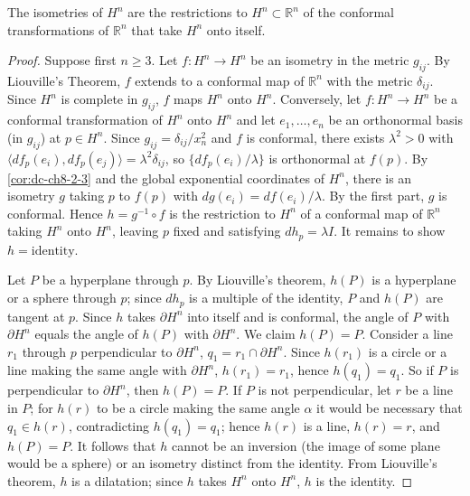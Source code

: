 \begin{theorem}
  \label{thm:dc-ch8-5-3}
  \notready
  The isometries of $H^n$ are the restrictions to $H^n\subset\mathbb{R}^n$ of the
  conformal transformations of $\mathbb{R}^n$ that take $H^n$ onto itself.
\end{theorem}
\begin{proof}
\sketch
  Suppose first $n\geq 3$. Let $f:H^n\to H^n$ be an isometry in the metric
  $g_{ij}$. By Liouville's Theorem, $f$ extends to a conformal map of $\mathbb{R}^n$
  with the metric $\delta_{ij}$. Since $H^n$ is complete in $g_{ij}$, $f$ maps $H^n$
  onto $H^n$. Conversely, let $f:H^n\to H^n$ be a conformal transformation of $H^n$
  onto $H^n$ and let $e_1,\dots,e_n$ be an orthonormal basis (in $g_{ij}$) at
  $p\in H^n$. Since $g_{ij}=\delta_{ij}/x_n^2$ and $f$ is conformal, there exists
  $\lambda^2>0$ with $\langle df_p(e_i),df_p(e_j)\rangle=\lambda^2\delta_{ij}$, so
  $\{df_p(e_i)/\lambda\}$ is orthonormal at $f(p)$. By
  \cref{cor:dc-ch8-2-3} and the global exponential coordinates of $H^n$, there is an isometry $g$ taking
  $p$ to $f(p)$ with $dg(e_i)=df(e_i)/\lambda$. By the first part, $g$ is conformal. Hence
  $h=g^{-1}\circ f$ is the restriction to $H^n$ of a conformal map of $\mathbb{R}^n$
  taking $H^n$ onto $H^n$, leaving $p$ fixed and satisfying $dh_p=\lambda I$. It
  remains to show $h=\text{identity}$.

  Let $P$ be a hyperplane through $p$. By Liouville's theorem, $h(P)$ is a hyperplane
  or a sphere through $p$; since $dh_p$ is a multiple of the identity, $P$ and $h(P)$
  are tangent at $p$. Since $h$ takes $\partial H^n$ into itself and is conformal,
  the angle of $P$ with $\partial H^n$ equals the angle of $h(P)$ with $\partial H^n$.
  We claim $h(P)=P$. Consider a line $r_1$ through $p$ perpendicular to
  $\partial H^n$, $q_1=r_1\cap\partial H^n$. Since $h(r_1)$ is a circle or a line
  making the same angle with $\partial H^n$, $h(r_1)=r_1$, hence $h(q_1)=q_1$. So if
  $P$ is perpendicular to $\partial H^n$, then $h(P)=P$. If $P$ is not perpendicular,
  let $r$ be a line in $P$; for $h(r)$ to be a circle making the same angle
  $\alpha$ it would be necessary that $q_1\in h(r)$, contradicting $h(q_1)=q_1$;
  hence $h(r)$ is a line, $h(r)=r$, and $h(P)=P$. It follows that $h$ cannot be an
  inversion (the image of some plane would be a sphere) or an isometry distinct from
  the identity. From Liouville's theorem, $h$ is a dilatation; since $h$ takes $H^n$
  onto $H^n$, $h$ is the identity.


\end{proof}
